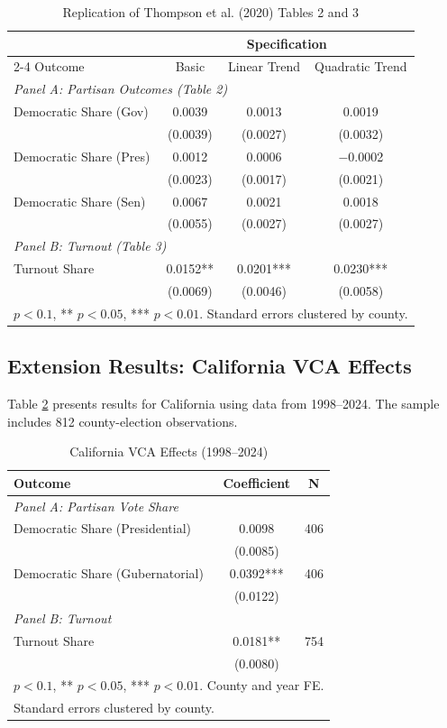 \documentclass[12pt]{article}
\begin{document}
\begin{table}[H]
\centering
\caption{Replication of Thompson et al. (2020) Tables 2 and 3}
\label{tab:replication}
\begin{tabular}{lccc}
\toprule
& \multicolumn{3}{c}{Specification} \\
\cmidrule(lr){2-4}
Outcome & Basic & Linear Trend & Quadratic Trend \\
\midrule
\multicolumn{4}{l}{\textit{Panel A: Partisan Outcomes (Table 2)}} \\
Democratic Share (Gov) & 0.0039 & 0.0013 & 0.0019 \\
& (0.0039) & (0.0027) & (0.0032) \\
Democratic Share (Pres) & 0.0012 & 0.0006 & $-$0.0002 \\
& (0.0023) & (0.0017) & (0.0021) \\
Democratic Share (Sen) & 0.0067 & 0.0021 & 0.0018 \\
& (0.0055) & (0.0027) & (0.0027) \\
\midrule
\multicolumn{4}{l}{\textit{Panel B: Turnout (Table 3)}} \\
Turnout Share & 0.0152** & 0.0201*** & 0.0230*** \\
& (0.0069) & (0.0046) & (0.0058) \\
\bottomrule
\multicolumn{4}{l}{\footnotesize * $p<0.1$, ** $p<0.05$, *** $p<0.01$. Standard errors clustered by county.} \\
\end{tabular}
\end{table}

\subsection{Extension Results: California VCA Effects}

Table \ref{tab:california} presents results for California using data from 1998--2024. The sample includes 812 county-election observations.

\begin{table}[H]
\centering
\caption{California VCA Effects (1998--2024)}
\label{tab:california}
\begin{tabular}{lcc}
\toprule
Outcome & Coefficient & N \\
\midrule
\multicolumn{3}{l}{\textit{Panel A: Partisan Vote Share}} \\
Democratic Share (Presidential) & 0.0098 & 406 \\
& (0.0085) & \\
Democratic Share (Gubernatorial) & 0.0392*** & 406 \\
& (0.0122) & \\
\midrule
\multicolumn{3}{l}{\textit{Panel B: Turnout}} \\
Turnout Share & 0.0181** & 754 \\
& (0.0080) & \\
\bottomrule
\multicolumn{3}{l}{\footnotesize * $p<0.1$, ** $p<0.05$, *** $p<0.01$. County and year FE.} \\
\multicolumn{3}{l}{\footnotesize Standard errors clustered by county.} \\
\end{tabular}
\end{table}
\end{document}
